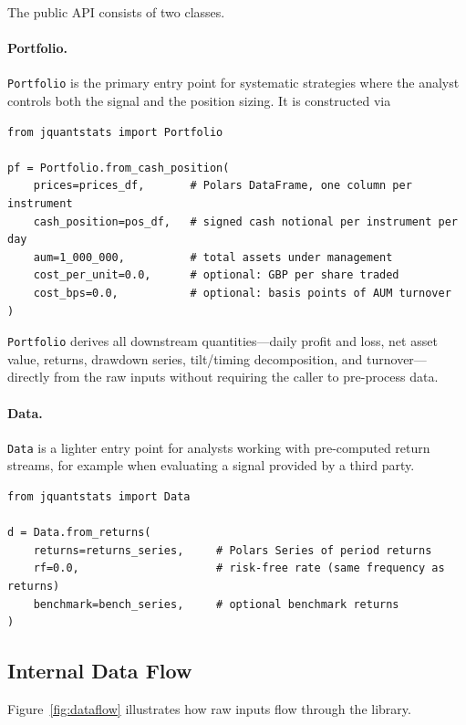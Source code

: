 \documentclass[11pt,a4paper]{article}
\begin{document}
The public API consists of two classes.

\paragraph{Portfolio.}
\texttt{Portfolio} is the primary entry point for systematic strategies where
the analyst controls both the signal and the position sizing.  It is constructed
via

\begin{lstlisting}[caption={Constructing a Portfolio from prices and positions.}]
from jquantstats import Portfolio

pf = Portfolio.from_cash_position(
    prices=prices_df,       # Polars DataFrame, one column per instrument
    cash_position=pos_df,   # signed cash notional per instrument per day
    aum=1_000_000,          # total assets under management
    cost_per_unit=0.0,      # optional: GBP per share traded
    cost_bps=0.0,           # optional: basis points of AUM turnover
)
\end{lstlisting}

\texttt{Portfolio} derives all downstream quantities—daily profit and loss,
net asset value, returns, drawdown series, tilt/timing decomposition, and
turnover—directly from the raw inputs without requiring the caller to pre-process
data.

\paragraph{Data.}
\texttt{Data} is a lighter entry point for analysts working with pre-computed
return streams, for example when evaluating a signal provided by a third party.

\begin{lstlisting}[caption={Constructing a Data object from returns.}]
from jquantstats import Data

d = Data.from_returns(
    returns=returns_series,     # Polars Series of period returns
    rf=0.0,                     # risk-free rate (same frequency as returns)
    benchmark=bench_series,     # optional benchmark returns
)
\end{lstlisting}

\subsection{Internal Data Flow}

Figure~\ref{fig:dataflow} illustrates how raw inputs flow through the library.
\end{document}
